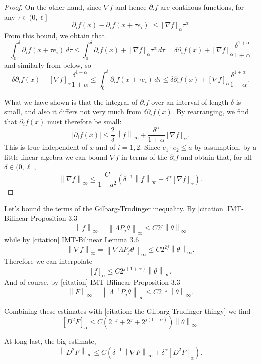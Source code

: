 \documentclass[11pt]{amsart}
\theoremstyle{remark}
\newcommand{\norm}[1]{\left\lVert#1\right\rVert}
\newcommand{\paren}[1]{\left( #1 \right)}
\newcommand{\bracket}[1]{\left[ #1 \right]}
\newcommand{\abs}[1]{\left\lvert #1 \right\rvert}
\newcommand{\del}{\partial}
\newcommand{\grad}{\nabla}
\newcommand{\n}{^{-1}}
\begin{document}
\begin{proof}
On the other hand, since $\grad f$ and hence $\del_i f$ are continous functions, for any $\tau \in (0,\ell]$
\[ \abs{\del_i f(x) - \del_i f(x+\tau e_i)} \leq \bracket{\grad f}_\alpha \tau^\alpha. \]
From this bound, we obtain that
\[ \int_0^\delta \del_i f(x + \tau e_i) \,d\tau \leq \int_0^\delta \del_i f(x) + \bracket{\grad f}_\alpha \tau^\alpha \,d\tau = \delta \del_i f(x) + \bracket{\grad f}_\alpha \frac{\delta^{1+\alpha}}{1+\alpha} \]
and similarly from below, so
\[ \delta \del_i f(x) - \bracket{\grad f}_\alpha \frac{\delta^{1+\alpha}}{1+\alpha} \leq \int_0^\delta \del_i f(x + \tau e_i) \,d\tau \leq \delta \del_i f(x) + \bracket{\grad f}_\alpha \frac{\delta^{1+\alpha}}{1+\alpha}. \]

What we have shown is that the integral of $\del_i f$ over an interval of length $\delta$ is small, and also it differs not very much from $\delta \del_i f(x)$.  By rearranging, we find that $\del_i f(x)$ must therefore be small:
\[ \abs{\del_i f(x)} \leq \frac{2}{\delta} \norm{f}_\infty + \frac{\delta^\alpha}{1+\alpha} \bracket{\grad f}_\alpha. \]
This is true independent of $x$ and of $i=1,2$.  Since $e_1 \cdot e_2 \leq a$ by assumption, by a little linear algebra we can bound $\grad f$ in terms of the $\del_i f$ and obtain that, for all $\delta \in (0,\ell]$,
\[ \norm{\grad f}_\infty \leq \frac{C}{1-a^2} \paren{ \delta\n \norm{f}_\infty + \delta^\alpha \bracket{\grad f}_\alpha }. \]

\end{proof}

Let's bound the terms of the Gilbarg-Trudinger inequality.  By [citation] IMT-Bilinear Proposition 3.3
\[ \norm{f}_\infty = \norm{\Lambda P_j \theta}_\infty \leq C 2^j \norm{\theta}_\infty \]
while by [citation] IMT-Bilinear Lemma 3.6
\[ \norm{\grad f}_\infty = \norm{\grad \Lambda P_j \theta}_\infty \leq C 2^{2j} \norm{\theta}_\infty. \]
Therefore we can interpolate
\[ \bracket{f}_\alpha \leq C 2^{j(1+\alpha)} \norm{\theta}_\infty. \]
And of course, by [citation] IMT-Bilinear Proposition 3.3
\[ \norm{F}_\infty = \norm{\Lambda^{-1} P_j \theta}_\infty \leq C 2^{-j} \norm{\theta}_\infty. \]

Combining these estimates with [citation: the Gilbarg-Trudinger thingy] we find
\[ \bracket{D^2 F}_\alpha \leq C \paren{2^{-j} + 2^j + 2^{j(1+\alpha)}} \norm{\theta}_\infty. \]

At long last, the big estimate,
\[ \norm{D^2 F}_\infty \leq C \paren{\delta\n \norm{\grad F}_\infty + \delta^{\alpha} \bracket{D^2 F}_\alpha}. \]
\end{document}
